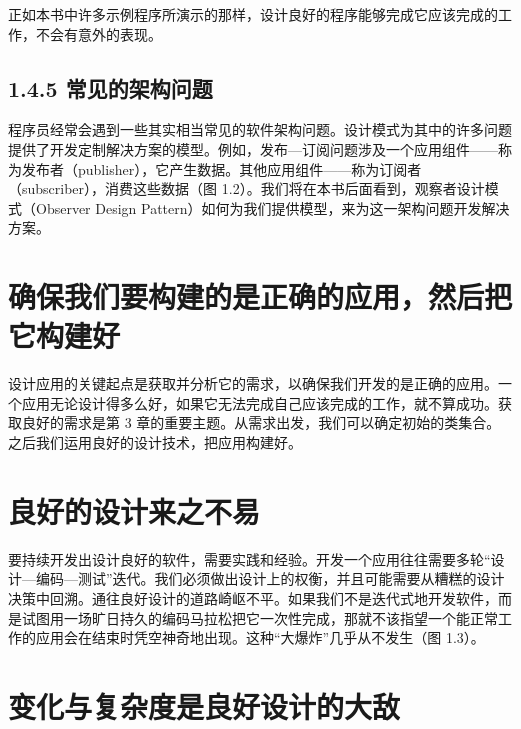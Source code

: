 正如本书中许多示例程序所演示的那样，设计良好的程序能够完成它应该完成的工作，不会有意外的表现。

\subsection{1.4.5 常见的架构问题}

程序员经常会遇到一些其实相当常见的软件架构问题。设计模式为其中的许多问题提供了开发定制解决方案的模型。例如，发布—订阅问题涉及一个应用组件——称为发布者（publisher），它产生数据。其他应用组件——称为订阅者（subscriber），消费这些数据（图 1.2）。我们将在本书后面看到，观察者设计模式（Observer Design Pattern）如何为我们提供模型，来为这一架构问题开发解决方案。


\section{确保我们要构建的是正确的应用，然后把它构建好}

设计应用的关键起点是获取并分析它的需求，以确保我们开发的是正确的应用。一个应用无论设计得多么好，如果它无法完成自己应该完成的工作，就不算成功。获取良好的需求是第 3 章的重要主题。从需求出发，我们可以确定初始的类集合。之后我们运用良好的设计技术，把应用构建好。

\section{良好的设计来之不易}

要持续开发出设计良好的软件，需要实践和经验。开发一个应用往往需要多轮“设计—编码—测试”迭代。我们必须做出设计上的权衡，并且可能需要从糟糕的设计决策中回溯。通往良好设计的道路崎岖不平。如果我们不是迭代式地开发软件，而是试图用一场旷日持久的编码马拉松把它一次性完成，那就不该指望一个能正常工作的应用会在结束时凭空神奇地出现。这种“大爆炸”几乎从不发生（图 1.3）。


\section{变化与复杂度是良好设计的大敌}


